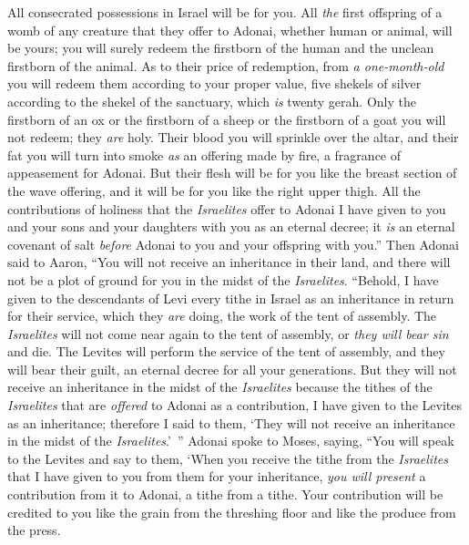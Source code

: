 \begin{biblechapter}
\verse All consecrated possessions in Israel will be for you.
\verse All \textit{the} first offspring of a womb of any creature that they offer to Adonai, whether human or animal, will be yours; you will surely redeem the firstborn of the human and the unclean firstborn of the animal.
\verse As to their price of redemption, from \textit{a one-month-old} you will redeem them according to your proper value, five shekels of silver according to the shekel of the sanctuary, which \textit{is} twenty gerah.
\verse Only the firstborn of an ox or the firstborn of a sheep or the firstborn of a goat you will not redeem; they \textit{are} holy. Their blood you will sprinkle over the altar, and their fat you will turn into smoke \textit{as} an offering made by fire, a fragrance of appeasement for Adonai.
\verse But their flesh will be for you like the breast section of the wave offering, and it will be for you like the right upper thigh.
\verse All the contributions of holiness that the \textit{Israelites} offer to Adonai I have given to you and your sons and your daughters with you as an eternal decree; it \textit{is} an eternal covenant of salt \textit{before} Adonai to you and your offspring with you.”
\verse Then Adonai said to Aaron, “You will not receive an inheritance in their land, and there will not be a plot of ground for you in the midst of the \textit{Israelites}.
\verse “Behold, I have given to the descendants of Levi every tithe in Israel as an inheritance in return for their service, which they \textit{are} doing, the work of the tent of assembly.
\verse The \textit{Israelites} will not come near again to the tent of assembly, or \textit{they will bear sin} and die.
\verse The Levites will perform the service of the tent of assembly, and they will bear their guilt, an eternal decree for all your generations. But they will not receive an inheritance in the midst of the \textit{Israelites}
\verse because the tithes of the \textit{Israelites} that are \textit{offered} to Adonai as a contribution, I have given to the Levites as an inheritance; therefore I said to them, ‘They will not receive an inheritance in the midst of the \textit{Israelites}.’ ”
\verse Adonai spoke to Moses, saying,
\verse “You will speak to the Levites and say to them, ‘When you receive the tithe from the \textit{Israelites} that I have given to you from them for your inheritance, \textit{you will present} a contribution from it to Adonai, a tithe from a tithe.
\verse Your contribution will be credited to you like the grain from the threshing floor and like the produce from the press.

\end{biblechapter}
